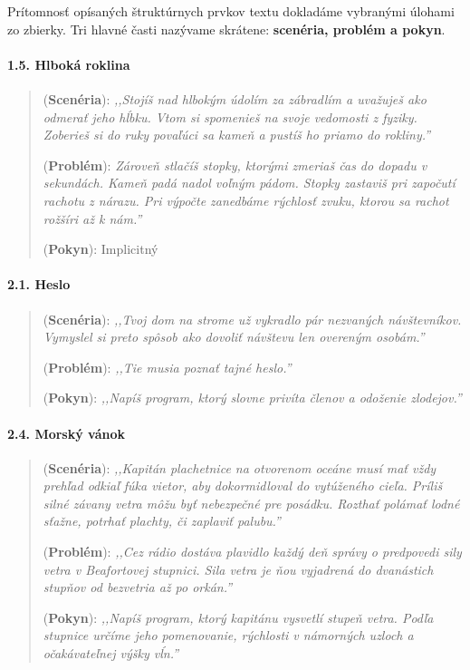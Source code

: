Prítomnosť opísaných štruktúrnych prvkov textu dokladáme vybranými úlohami zo zbierky. Tri hlavné časti nazývame skrátene: \textbf{scenéria, problém a pokyn}.

\paragraph{1.5. Hlboká roklina}
\begin{quote}
(\textbf{Scenéria}): \textit{\small ,,Stojíš nad hlbokým údolím za zábradlím a uvažuješ ako odmerať jeho hĺbku. Vtom si spomenieš na svoje vedomosti z fyziky. Zoberieš si do ruky povaľúci sa kameň a pustíš ho priamo do rokliny.''}

(\textbf{Problém}):  \textit{\small Zároveň stlačíš stopky, ktorými zmeriaš čas do dopadu v sekundách. Kameň padá nadol voľným pádom. Stopky zastaviš pri započutí rachotu z nárazu. 
Pri výpočte zanedbáme rýchlosť zvuku, ktorou sa rachot rožšíri až k nám.''}

(\textbf{Pokyn}): Implicitný
\end{quote}

\paragraph{2.1. Heslo}
\begin{quote}
(\textbf{Scenéria}): \textit{\small ,,Tvoj dom na strome už vykradlo pár nezvaných návštevníkov. Vymyslel si preto spôsob ako dovoliť návštevu len overeným osobám.''}

(\textbf{Problém}): \textit{\small ,,Tie musia poznať tajné heslo.''}

(\textbf{Pokyn}): \textit{\small ,,Napíš program, ktorý slovne privíta členov a odoženie zlodejov.''}
\end{quote}

\paragraph{2.4. Morský vánok}
\begin{quote}
(\textbf{Scenéria}): \textit{\small ,,Kapitán plachetnice na otvorenom oceáne musí mať vždy prehľad odkiaľ fúka vietor, aby dokormidloval do vytúženého cieľa. Príliš silné závany vetra môžu byť nebezpečné pre posádku. Rozthať polámať lodné sťažne, potrhať plachty, či zaplaviť palubu.''}

(\textbf{Problém}): \textit{\small ,,Cez rádio dostáva plavidlo každý deň správy o predpovedi sily vetra v Beafortovej stupnici. Sila vetra je ňou vyjadrená do dvanástich stupňov od bezvetria až po orkán.''} 

(\textbf{Pokyn}): \textit{\small ,,Napíš program, ktorý kapitánu vysvetlí stupeň vetra. Podľa stupnice určíme jeho pomenovanie, rýchlosti v námorných uzloch a očakávateľnej výšky vĺn.''}
\end{quote}


